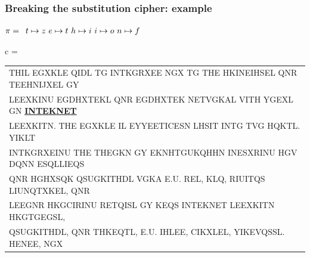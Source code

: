 \documentclass[aspectratio=169, lualatex, handout, 10pt,dvipsnames,svgnames]{beamer} %
\def\enbleu#1{\textcolor{bleu}{#1}}
\def\enrouge#1{\textcolor{rouge}{#1}}
\begin{document}
\begin{frame}
  \frametitle{Breaking the substitution cipher: example}
  
    \enrouge{
    \tiny{$\pi=
      \begin{array}[t]{l}
      t\mapsto z\ e\mapsto t\ h\mapsto i\ i\mapsto o\ n\mapsto f
      \end{array}
      $}}
  \vspace{0.25cm}

  \color{vert}
  \tiny{c =
    \begin{tabular}[t]{l}
      \enbleu{T}\enbleu{H}\enbleu{I}L EGXKL\enbleu{E} Q\enbleu{I}DL \enbleu{T}G \enbleu{I}\enbleu{N}\enbleu{T}KGRXE\enbleu{E} NGX \enbleu{T}G \enbleu{T}\enbleu{H}\enbleu{E} HK\enbleu{I}\enbleu{N}E\enbleu{I}HS\enbleu{E}L Q\enbleu{N}R \enbleu{T}\enbleu{E}E\enbleu{H}\enbleu{N}\enbleu{I}JX\enbleu{E}L GY \\
      L\enbleu{E}EXK\enbleu{I}\enbleu{N}U EGDHX\enbleu{T}\enbleu{E}KL Q\enbleu{N}R EGDHX\enbleu{T}\enbleu{E}K \enbleu{N}\enbleu{E}\enbleu{T}VGKAL V\enbleu{I}\enbleu{T}\enbleu{H} YGEXL G\enbleu{N} \underline{\bf \enbleu{I}\enbleu{N}\enbleu{T}\enbleu{E}K\enbleu{N}\enbleu{E}\enbleu{T}} \\
      L\enbleu{E}EXK\enbleu{I}\enbleu{T}N. \enbleu{T}\enbleu{H}\enbleu{E} EGXKL\enbleu{E} \enbleu{I}L \enbleu{E}YY\enbleu{E}E\enbleu{T}\enbleu{I}C\enbleu{E}SN LHS\enbleu{I}\enbleu{T} \enbleu{I}\enbleu{N}\enbleu{T}G \enbleu{T}VG HQK\enbleu{T}L. Y\enbleu{I}KL\enbleu{T} \\
      \enbleu{I}\enbleu{N}\enbleu{T}KGRXE\enbleu{I}\enbleu{N}U \enbleu{T}\enbleu{H}\enbleu{E} \enbleu{T}\enbleu{H}\enbleu{E}GKN GY EKNH\enbleu{T}GUKQH\enbleu{H}N \enbleu{I}\enbleu{N}ESXR\enbleu{I}\enbleu{N}U \enbleu{H}GV DQ\enbleu{N}N ESQLL\enbleu{I}EQS \\
      Q\enbleu{N}R HGHXSQK QSUGK\enbleu{I}\enbleu{T}\enbleu{H}DL VGKA \enbleu{E}.U. R\enbleu{E}L, KLQ, R\enbleu{I}U\enbleu{I}\enbleu{T}QS L\enbleu{I}U\enbleu{N}Q\enbleu{T}XK\enbleu{E}L, Q\enbleu{N}R \\
      L\enbleu{E}EG\enbleu{N}R HKGC\enbleu{I}R\enbleu{I}\enbleu{N}U R\enbleu{E}\enbleu{T}Q\enbleu{I}SL GY K\enbleu{E}QS \enbleu{I}\enbleu{N}\enbleu{T}\enbleu{E}K\enbleu{N}\enbleu{E}\enbleu{T} L\enbleu{E}EXK\enbleu{I}\enbleu{T}N HKG\enbleu{T}GEGSL, \\
      QSUGK\enbleu{I}\enbleu{T}\enbleu{H}DL, Q\enbleu{N}R \enbleu{T}\enbleu{H}K\enbleu{E}Q\enbleu{T}L, \enbleu{E}.U. \enbleu{I}HL\enbleu{E}E, C\enbleu{I}KXL\enbleu{E}L, Y\enbleu{I}K\enbleu{E}VQSSL. \enbleu{H}\enbleu{E}\enbleu{N}E\enbleu{E}, NGX \\

\end{tabular}}
\end{frame}
\end{document}

